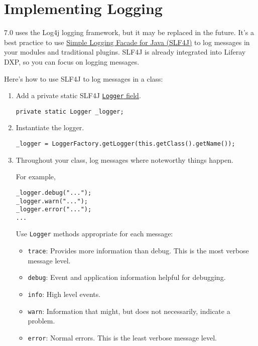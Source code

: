 \chapter{Implementing Logging}\label{implementing-logging}

7.0 uses the Log4j logging framework, but it may be replaced in the
future. It's a best practice to use \href{https://www.slf4j.org/}{Simple
Logging Facade for Java (SLF4J)} to log messages in your modules and
traditional plugins. SLF4J is already integrated into Liferay DXP, so
you can focus on logging messages.

Here's how to use SLF4J to log messages in a class:

\begin{enumerate}
\def\labelenumi{\arabic{enumi}.}
\item
  Add a private static SLF4J
  \href{https://www.slf4j.org/apidocs/org/slf4j/Logger.html}{\texttt{Logger}
  field}.

\begin{verbatim}
private static Logger _logger;
\end{verbatim}
\item
  Instantiate the logger.

\begin{verbatim}
_logger = LoggerFactory.getLogger(this.getClass().getName());
\end{verbatim}
\item
  Throughout your class, log messages where noteworthy things happen.

  For example,

\begin{verbatim}
_logger.debug("...");
_logger.warn("...");
_logger.error("...");
...
\end{verbatim}

  Use \texttt{Logger} methods appropriate for each message:

  \begin{itemize}
  \tightlist
  \item
    \texttt{trace}: Provides more information than debug. This is the
    most verbose message level.
  \item
    \texttt{debug}: Event and application information helpful for
    debugging.
  \item
    \texttt{info}: High level events.
  \item
    \texttt{warn}: Information that might, but does not necessarily,
    indicate a problem.
  \item
    \texttt{error}: Normal errors. This is the least verbose message
    level.
  \end{itemize}
\end{enumerate}

